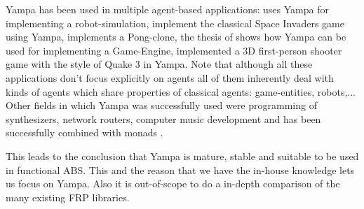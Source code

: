 Yampa has been used in multiple agent-based applications: \cite{hudak_arrows_2003} uses Yampa for implementing a robot-simulation, \cite{courtney_yampa_2003} implement the classical Space Invaders game using Yampa, \cite{nilsson_declarative_2014} implements a Pong-clone, the thesis of \cite{meisinger_game-engine-architektur_2010} shows how Yampa can be used for implementing a Game-Engine, \cite{mun_hon_functional_2005} implemented a 3D first-person shooter game with the style of Quake 3 in Yampa. Note that although all these applications don't focus explicitly on agents all of them inherently deal with kinds of agents which share properties of classical agents: game-entities, robots,... Other fields in which Yampa was successfully used were programming of synthesizers, network routers, computer music development and has been successfully combined with monads \cite{perez_functional_2016}.

This leads to the conclusion that Yampa is mature, stable and suitable to be used in functional ABS. This and the reason that we have the in-house knowledge lets us focus on Yampa. Also it is out-of-scope to do a in-depth comparison of the many existing FRP libraries.